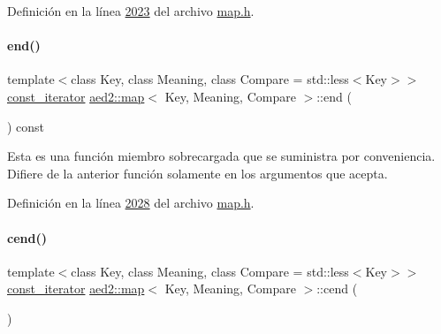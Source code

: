 Definición en la línea \hyperlink{map_8h_source_l02023}{2023} del archivo \hyperlink{map_8h_source}{map.\+h}.

\mbox{\label{classaed2_1_1map_a91e7cad1a638c55659c169d5574cd5d7_a91e7cad1a638c55659c169d5574cd5d7}} 
\paragraph{\texorpdfstring{end()}{end()}\hspace{0.1cm}{\footnotesize\ttfamily [2/2]}}
{\footnotesize\ttfamily template$<$class Key, class Meaning, class Compare = std\+::less$<$\+Key$>$$>$ \\
\hyperlink{classaed2_1_1map_1_1const__iterator}{const\+\_\+iterator} \hyperlink{classaed2_1_1map}{aed2\+::map}$<$ Key, Meaning, Compare $>$\+::end (\begin{DoxyParamCaption}{ }\end{DoxyParamCaption}) const\hspace{0.3cm}{\ttfamily [inline]}}

Esta es una función miembro sobrecargada que se suministra por conveniencia. Difiere de la anterior función solamente en los argumentos que acepta. 

Definición en la línea \hyperlink{map_8h_source_l02028}{2028} del archivo \hyperlink{map_8h_source}{map.\+h}.

\mbox{\label{classaed2_1_1map_a7bb91e94cbc875f1a011b142ef877912_a7bb91e94cbc875f1a011b142ef877912}} 
\paragraph{\texorpdfstring{cend()}{cend()}}
{\footnotesize\ttfamily template$<$class Key, class Meaning, class Compare = std\+::less$<$\+Key$>$$>$ \\
\hyperlink{classaed2_1_1map_1_1const__iterator}{const\+\_\+iterator} \hyperlink{classaed2_1_1map}{aed2\+::map}$<$ Key, Meaning, Compare $>$\+::cend (\begin{DoxyParamCaption}{ }\end{DoxyParamCaption})\hspace{0.3cm}{\ttfamily [inline]}}


